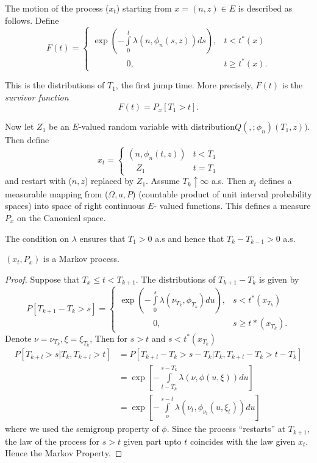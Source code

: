 The motion of the process ($x_t$) starting from $x = (n, z )\in E$ is
described as follows. Define  
$$
F(t) =
\begin{cases}
   \exp \left(- \int\limits ^t_0 \lambda (n, \phi_n (s,z)) ds\right),
   & t < t^*(x)\\ 
  \qquad \qquad 0, & t \geq t^* (x). 				 
\end{cases}		
$$

This is the distributions of $T_1$, the first jump time. More
precisely, $F(t)$ is the \textit{ survivor function} 
$$
F(t) = P_x [T_1 > t].
$$


Now let $Z_1$ be an $E$-valued random variable with distribution\break $Q
(,; \phi_n) (T_1, z))$. Then define  
$$
x_t = 
\begin{cases}
(n, \phi_n (t, z)) & t < T_1\\
\quad Z_1 & t =T_1
\end{cases}
$$
and restart with ($n, z$) replaced by $Z_1$. Assume $T_k\uparrow
\infty $ a.s. Then $x_t$ defines a measurable mapping from ($\Omega,
a, P$) (countable product of unit interval probability spaces) into
space of right continuous $E$- valued functions. This defines a measure
$P_x$ on the Canonical space.  

\medskip
{}
 The condition on $\lambda$ ensures that $T_1 > 0$ a.s and
hence that $T_{k} - T_{k-1} > 0 $ a.s.  

\begin{prop} %
  $(x_t, P_x)$ is a Markov process. 
\end{prop}

\begin{proof}
  Suppose that $T_x \leq t < T_{k+1}$. The distributions of
  $T_{k+1}-T_k$ is given by  
  $$ 
  P[T_{k+1}- T_k > s]= 
  \begin{cases}
    \exp \left(- \int\limits^s_0 \lambda
    \left(\nu_{T_k},\phi_{T_k}\right)du \right), & s< t^* (x_{T_k})\\ 
    \qquad \qquad 0, & s\geq t*(x_{T_k}).
\end{cases}
$$\pageoriginale
Denote $\nu = \nu_{T_k}, \xi = \xi_{T_k} $, Then for $s > t$ and $s<
t^* (x_{T_k})$ 
\begin{align*}
  P[T_{k+l}> s | T_k, T_{k+l}> t] & = P[T_{k+l}-T_k > s-T_k | T_k,
    T_{k+l}-T_k > t- T_k]\\ 
  & = \exp \left[-\int \limits^{s-T_k}_{t-T_k}\lambda (\nu, \phi (u, \xi
    ))du\right]\\
  & = \exp \left[-\int\limits^{s-t}_o \lambda(\nu_t, \phi_{\nu_t}(u,
    \xi_t )) du\right] 
\end{align*}
where we used the semigroup property of $\phi$. Since the process
``restarts'' at $T_{k+1}$, the law of the process for $s > t$ given
part upto $t$ coincides with the law given $x_t$. Hence the Markov
Property. 
\end{proof}

